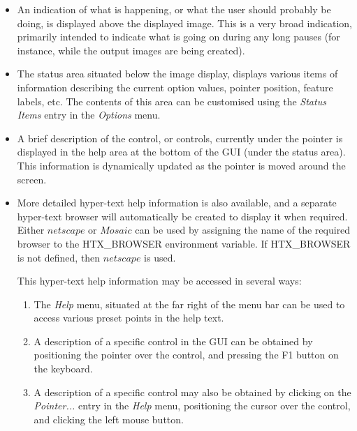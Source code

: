 \documentclass[11pt]{article}
\newcommand{\htmlref}[2]{#1}
\begin{document}
\begin{itemize}

\item An indication of what is happening, or what the user should
probably be doing, is displayed above the displayed image. This is a very
broad indication, primarily intended to indicate what is going on during
any long pauses (for instance, while the output images are being
created).

\item The \htmlref{status area}{POLKA_STATUS_AREA} situated below
the image display, displays various items of information describing the
current option values, pointer position, feature labels, etc. The
contents of this area can be customised using the \htmlref{\emph{Status
Items}}{POLKA_STATUS_ITEMS} entry in the \htmlref{{\em
Options}}{POLKA_OPTIONS_MENU} menu.

\item A brief description of the control, or controls, currently under the
pointer is displayed in the \htmlref{help area}{POLKA_HELP_AREA} at the
bottom of the GUI (under the status area). This information is
dynamically updated as the pointer is moved around the screen.

\item More detailed hyper-text help information is also available, and a
separate hyper-text browser will automatically be created to display it
when required. Either $netscape$ or $Mosaic$ can be used by
assigning the name of the required browser to the HTX\_BROWSER
environment variable. If HTX\_BROWSER is not defined, then $netscape$
is used.

This hyper-text help information may be accessed in several ways:

\begin{enumerate}

\item The \htmlref{\emph{Help}}{POLKA_HELP_MENU} menu, situated at the
far right of the menu bar can be used to access various preset points in
the help text.

\item A description of a specific control in the GUI can be obtained by
positioning the pointer over the control, and pressing the F1
button on the keyboard.

\item A description of a specific control may also be obtained by clicking
on the \emph{Pointer...} entry in the \htmlref{{\em
Help}}{POLKA_HELP_MENU} menu, positioning the cursor over the control,
and clicking the left mouse button.

\end{enumerate}

\end{itemize}
\end{document}
